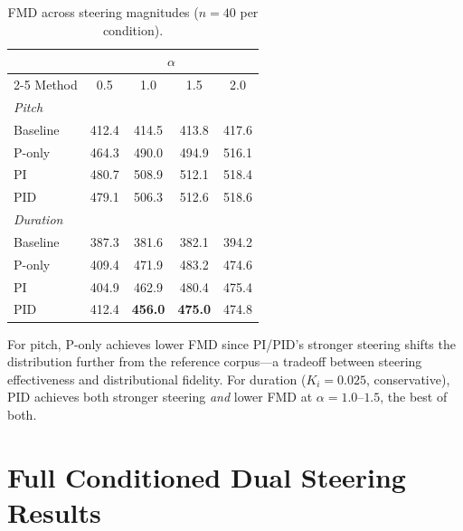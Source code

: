 \documentclass{article}
\theoremstyle{plain}
\begin{document}
\begin{table}[h]
  \caption{FMD across steering magnitudes ($n{=}40$ per condition).}
  \label{tab:fmd_sweep}
  \begin{center}
  \begin{small}
  \begin{tabular}{lcccc}
    \toprule
    & \multicolumn{4}{c}{$\alpha$} \\
    \cmidrule(lr){2-5}
    Method & 0.5 & 1.0 & 1.5 & 2.0 \\
    \midrule
    \multicolumn{5}{l}{\textit{Pitch}} \\
    Baseline & 412.4 & 414.5 & 413.8 & 417.6 \\
    P-only & 464.3 & 490.0 & 494.9 & 516.1 \\
    PI & 480.7 & 508.9 & 512.1 & 518.4 \\
    PID & 479.1 & 506.3 & 512.6 & 518.6 \\
    \midrule
    \multicolumn{5}{l}{\textit{Duration}} \\
    Baseline & 387.3 & 381.6 & 382.1 & 394.2 \\
    P-only & 409.4 & 471.9 & 483.2 & 474.6 \\
    PI & 404.9 & 462.9 & 480.4 & 475.4 \\
    PID & 412.4 & \textbf{456.0} & \textbf{475.0} & 474.8 \\
    \bottomrule
  \end{tabular}
  \end{small}
  \end{center}
\end{table}

For pitch, P-only achieves lower FMD since PI/PID's stronger steering shifts the distribution further from the reference corpus---a tradeoff between steering effectiveness and distributional fidelity. For duration ($K_i{=}0.025$, conservative), PID achieves both stronger steering \emph{and} lower FMD at $\alpha{=}1.0$--$1.5$, the best of both.

\section{Full Conditioned Dual Steering Results}
\label{app:conditioned_dual}
\end{document}
